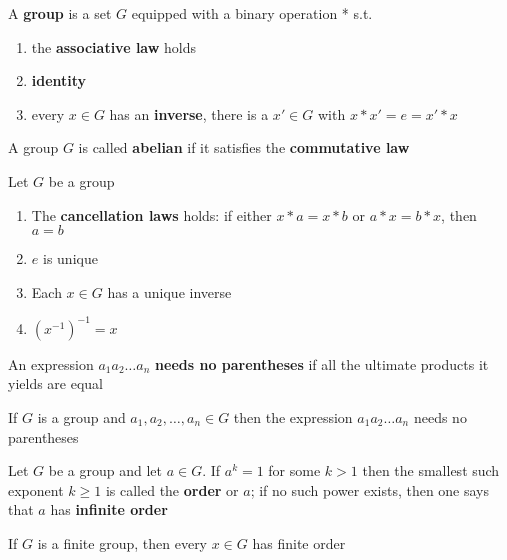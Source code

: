 \documentclass[11pt]{article}
\begin{document}
\begin{definition}[]
A \textbf{group} is a set \(G\) equipped with a binary operation * s.t.
\begin{enumerate}
\item the \textbf{associative law} holds
\item \textbf{identity}
\item every \(x\in G\) has an \textbf{inverse}, there is a \(x'\in G\)  with 
\(x*x'=e=x'*x\)
\end{enumerate}
\end{definition}

\begin{definition}[]
A group \(G\) is called \textbf{abelian} if it satisfies the
\textbf{commutative law}
\end{definition}

\begin{lemma}[]
Let \(G\) be a group
\begin{enumerate}
\item The \textbf{cancellation laws} holds: if either \(x*a=x*b\) or \(a*x=b*x\), then
\(a=b\)
\item \(e\) is unique
\item Each \(x\in G\) has a unique inverse
\item \((x^{-1})^{-1}=x\)
\end{enumerate}
\end{lemma}

\begin{definition}[]
An expression \(a_1a_2\dots a_n\) \textbf{needs no parentheses} if all the ultimate
products it yields are equal
\end{definition}

\begin{theorem}
If \(G\) is a group and \(a_1,a_2,\dots,a_n\in G\) then the expression
\(a_1a_2\dots a_n\) needs no parentheses
\end{theorem}

\begin{definition}[]
Let \(G\) be a group and let \(a\in G\). If \(a^k=1\) for some \(k>1\) then the
smallest such exponent \(k\ge 1\) is called the \textbf{order} or \(a\); if no such
power exists, then one says that \(a\) has \textbf{infinite order}
\end{definition}

\begin{proposition}[]
If \(G\) is a finite group, then every \(x\in G\) has finite order
\end{proposition}
\end{document}
